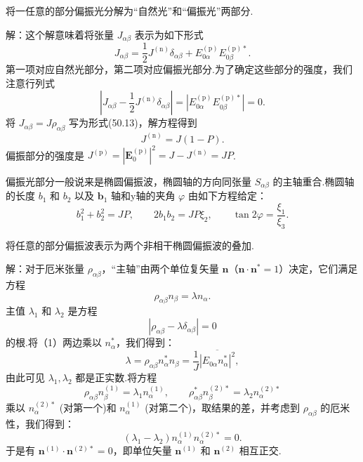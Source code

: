 \begin{xiti}

\quad 将一任意的部分偏振光分解为“自然光”和“偏振光”两部分.

解：这个解意味着将张量 $J_{\alpha\beta}$ 表示为如下形式
\begin{equation*}
  J_{\alpha\beta}=\frac{1}{2}J^{(\mathrm{n})}\delta_{\alpha\beta}
  +E_{0\alpha}^{(\mathrm{p})}E_{0\beta}^{(\mathrm{p})*}.
\end{equation*}
第一项对应自然光部分，第二项对应偏振光部分.为了确定这些部分的强度，我们注意行列式
\begin{equation*}
  \left|J_{\alpha\beta}-\frac{1}{2}J^{(\mathrm{n})}\delta_{\alpha\beta}\right|
  =\left|E_{0\alpha}^{(\mathrm{p})}E_{0\beta}^{(\mathrm{p})*}\right|=0.
\end{equation*}
将 $J_{\alpha\beta} = J\rho_{\alpha\beta}$ 写为形式(50.13)，解方程得到
\begin{equation*}
  J^{(\mathrm{n})}=J(1-P).
\end{equation*}
偏振部分的强度是 $J^{(\mathrm{p})} = |\boldsymbol{E}_0^{(\mathrm{p})}|^2 = J - J^{(\mathrm{n})} = JP$.

偏振光部分一般说来是椭圆偏振波，椭圆轴的方向同张量 $S_{\alpha\beta}$ 的主轴重合.椭圆轴的长度 $b_1$ 和 $b_2$ 以及 $\boldsymbol{b}_1$ 轴和y轴的夹角 $\varphi$ 由如下方程给定：
\begin{equation*}
  b_1^2+b_2^2=JP,\qquad
  2b_1b_2=JP\xi_2,\qquad
  \tan 2\varphi=\frac{\xi_1}{\xi_3}.
\end{equation*}

\quad 将任意的部分偏振波表示为两个非相干椭圆偏振波的叠加.

解：对于厄米张量 $\rho_{\alpha\beta}$，“主轴”由两个单位复矢量 $\boldsymbol{n}$（$\boldsymbol{n}\cdot\boldsymbol{n}^* = 1$）决定，它们满足方程
\begin{equation}\tag{1}
  \rho_{\alpha\beta}n_\beta=\lambda n_\alpha.
\end{equation}
主值 $\lambda_1$ 和 $\lambda_2$ 是方程
\begin{equation*}
  |\rho_{\alpha\beta}-\lambda\delta_{\alpha\beta}|=0
\end{equation*}
的根.将（1）两边乘以 $n_\alpha^*$，我们得到：
\begin{equation*}
  \lambda=\rho_{\alpha\beta}n_\alpha^*n_\beta
  =\frac{1}{J}\overline{|E_{0\alpha}n_\alpha^*|^2},
\end{equation*}
由此可见 $\lambda_1,\lambda_2$ 都是正实数.将方程
\begin{equation*}
  \rho_{\alpha\beta}n_\beta^{(1)}=\lambda_1 n_\alpha^{(1)},\qquad
  \rho_{\alpha\beta}^*n_\beta^{(2)*}=\lambda_2 n_\alpha^{(2)*}
\end{equation*}
乘以 $n_\alpha^{(2)*}$ (对第一个)和 $n_\alpha^{(1)}$ (对第二个)，取结果的差，并考虑到 $\rho_{\alpha\beta}$ 的厄米性，我们得到：
\begin{equation*}
  (\lambda_1-\lambda_2)n_\alpha^{(1)}n_\alpha^{(2)*}=0.
\end{equation*}
于是有 $\boldsymbol{n}^{(1)}\cdot\boldsymbol{n}^{(2)*} = 0$，即单位矢量 $\boldsymbol{n}^{(1)}$ 和 $\boldsymbol{n}^{(2)}$ 相互正交.


\end{xiti}
